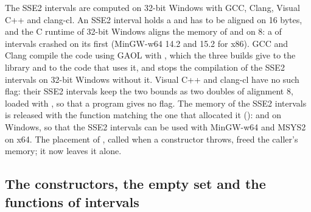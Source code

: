 \documentclass[12pt,a4paper,twoside,openright]{book}
\begin{document}
\medskip
The SSE2 intervals are computed on 32-bit Windows with GCC, Clang, Visual C++
and clang-cl.\newinvfive{} An SSE2 interval holds a  and has
to be aligned on 16 bytes, and the C runtime of 32-bit Windows aligns the
memory of  and  on 8: a  of
intervals crashed on its first  (MinGW-w64 14.2 and 15.2 for
x86). GCC and Clang compile the code using GAOL with
, which the three builds give to the library and to
the code that uses it, and  stops the compilation of
the SSE2 intervals on 32-bit Windows without it. Visual C++ and clang-cl have
no such flag: their SSE2 intervals keep the two bounds as two doubles of
alignment 8, loaded with , so that a program gives no flag. The
memory of the SSE2 intervals is released with the function matching the one
that allocated it ():  and
 on Windows, so that the SSE2 intervals can be used
with MinGW-w64 and MSYS2 on x64. The placement  of
, called when a constructor throws, freed the caller's memory;
it now leaves it alone.

\subsection{The constructors, the empty set and the functions of intervals}
\label{sec:changes-intervals}
%
%
\end{document}
